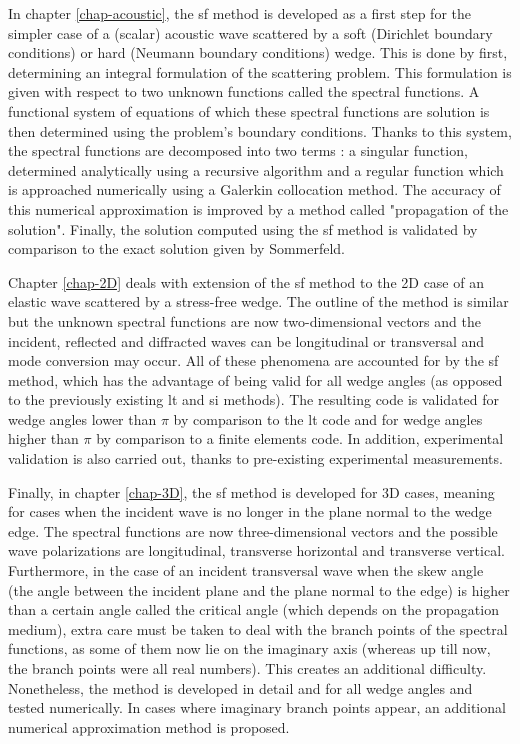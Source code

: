 In chapter \ref{chap-acoustic}, the \acrfull{sf} method is developed as a first step for the simpler case of a (scalar) acoustic wave scattered by a soft (Dirichlet boundary conditions) or hard (Neumann boundary conditions) wedge. This is done by first, determining an integral formulation of the scattering problem. This formulation is given with respect to two unknown functions called the spectral functions. A functional system of equations of which these spectral functions are solution is then determined using the problem's boundary conditions. Thanks to this system, the spectral functions are decomposed into two terms : a singular function, determined analytically using a recursive algorithm and a regular function which is approached numerically using a Galerkin collocation method. The accuracy of this numerical approximation is improved by a method called "propagation of the solution". Finally, the solution computed using the \acrlong{sf} method is validated by comparison to the exact solution given by Sommerfeld.

Chapter \ref{chap-2D} deals with extension of the \acrlong{sf} method to the 2D case of an elastic wave scattered by a stress-free wedge. The outline of the method is similar but the unknown spectral functions are now two-dimensional vectors and the incident, reflected and diffracted waves can be longitudinal or transversal and mode conversion may occur. All of these phenomena are accounted for by the \acrlong{sf} method, which has the advantage of being valid for all wedge angles (as opposed to the previously existing \acrfull{lt} and \acrlong{si} methods). The resulting code is validated for wedge angles lower than $\pi$ by comparison to the \acrshort{lt} code and for wedge angles higher than $\pi$ by comparison to a finite elements code. In addition, experimental validation is also carried out, thanks to pre-existing experimental measurements.

Finally, in chapter \ref{chap-3D}, the \acrlong{sf} method is developed for 3D cases, meaning for cases when the incident wave is no longer in the plane normal to the wedge edge. The spectral functions are now three-dimensional vectors and the possible wave polarizations are longitudinal, transverse horizontal and transverse vertical. Furthermore, in the case of an incident transversal wave when the skew angle (the angle between the incident plane and the plane normal to the edge) is higher than a certain angle called the critical angle (which depends on the propagation medium), extra care must be taken to deal with the branch points of the spectral functions, as some of them now lie on the imaginary axis (whereas up till now, the branch points were all real numbers). This creates an additional difficulty. Nonetheless, the method is developed in detail and for all wedge angles and tested numerically. In cases where imaginary branch points appear, an additional numerical approximation method is proposed.